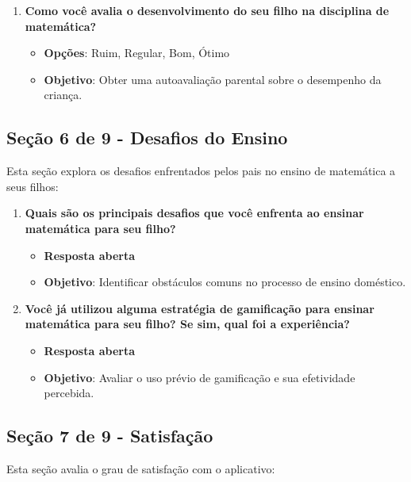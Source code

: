 \begin{enumerate}
    \item \textbf{Como você avalia o desenvolvimento do seu filho na disciplina de matemática?}
    \begin{itemize}
        \item \textbf{Opções}: Ruim, Regular, Bom, Ótimo
        \item \textbf{Objetivo}: Obter uma autoavaliação parental sobre o desempenho da criança.
    \end{itemize}
\end{enumerate}

\subsection{Seção 6 de 9 - Desafios do Ensino}

Esta seção explora os desafios enfrentados pelos pais no ensino de matemática a seus filhos:

\begin{enumerate}
    \item \textbf{Quais são os principais desafios que você enfrenta ao ensinar matemática para seu filho?}
    \begin{itemize}
        \item \textbf{Resposta aberta}
        \item \textbf{Objetivo}: Identificar obstáculos comuns no processo de ensino doméstico.
    \end{itemize}

    \item \textbf{Você já utilizou alguma estratégia de gamificação para ensinar matemática para seu filho? Se sim, qual foi a experiência?}
    \begin{itemize}
        \item \textbf{Resposta aberta}
        \item \textbf{Objetivo}: Avaliar o uso prévio de gamificação e sua efetividade percebida.
    \end{itemize}
\end{enumerate}

\subsection{Seção 7 de 9 - Satisfação}

Esta seção avalia o grau de satisfação com o aplicativo:


